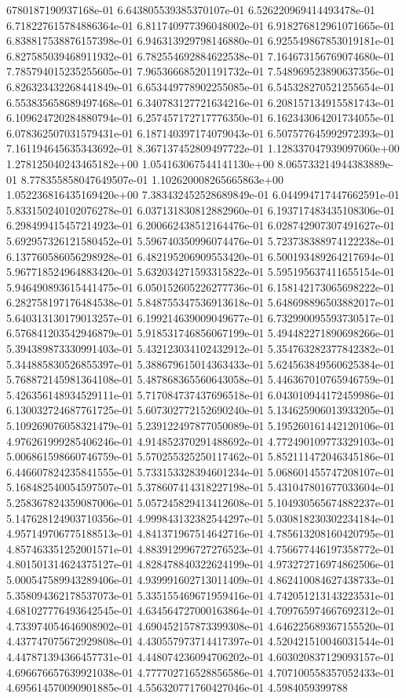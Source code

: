 6780187190937168e-01	6.643805539385370107e-01	6.526220969414493478e-01	6.718227615784886364e-01	6.811740977396048002e-01	6.918276812961071665e-01	6.838817538876157398e-01	6.946313929798146880e-01	6.925549867853019181e-01	6.827585039468911932e-01	6.782554692884622538e-01	7.164673156769074680e-01	7.785794015235255605e-01	7.965366685201191732e-01	7.548969523890637356e-01	6.826323432268441849e-01	6.653449778902255085e-01	6.545328270521255654e-01	6.553835658689497468e-01	6.340783127721634216e-01	6.208157134915581743e-01	6.109624720284880794e-01	6.257457172717776350e-01	6.162343064201734055e-01	6.078362507031579431e-01	6.187140397174079043e-01	6.507577645992972393e-01	7.161194645635343692e-01	8.367137452809497722e-01	1.128337047939097060e+00	1.278125040243465182e+00	1.054163067544141130e+00	8.065733214944383889e-01	8.778355858047649507e-01	1.102620008265665863e+00	1.052236816435169420e+00	7.383432452528689849e-01	6.044994717447662591e-01	5.833150240102076278e-01	6.037131830812882960e-01	6.193717483435108306e-01	6.298499415457214923e-01	6.200662438512164476e-01	6.028742907307491627e-01	5.692957326121580452e-01	5.596740350996074476e-01	5.723738388974122238e-01	6.137760586056298928e-01	6.482195206909553420e-01	6.500193489264217694e-01	5.967718524964883420e-01	5.632034271593315822e-01	5.595195637411655154e-01	5.946490893615441475e-01	6.050152605226277736e-01	6.158142173065698222e-01	6.282758197176484538e-01	5.848755347536913618e-01	5.648698896503882017e-01	5.640313130179013257e-01	6.199214639009049677e-01	6.732990095593730517e-01	6.576841203542946879e-01	5.918531746856067199e-01	5.494482271890698266e-01	5.394389873330991403e-01	5.432123034102432912e-01	5.354763282377842382e-01	5.344885830526855397e-01	5.388679615014363433e-01	5.624563849560625384e-01	5.768872145981364108e-01	5.487868365560643058e-01	5.446367010765946759e-01	5.426356148934529111e-01	5.717084737437696518e-01	6.043010944172459986e-01	6.130032724687761725e-01	5.607302772152690240e-01	5.134625906013933205e-01	5.109269076058321479e-01	5.239122497877050089e-01	5.195260161442120106e-01	4.976261999285406246e-01	4.914852370291488692e-01	4.772490109773329103e-01	5.006861598660746759e-01	5.570255325250117462e-01	5.852111472046345186e-01	6.446607824235841555e-01	5.733153328394601234e-01	5.068601455747208107e-01	5.168482540054597507e-01	5.378607414318227198e-01	5.431047801677033604e-01	5.258367824359087006e-01	5.057245829413412608e-01	5.104930565674882237e-01	5.147628124903710356e-01	4.999843132382544297e-01	5.030818230302234184e-01	4.957149706775188513e-01	4.841371967514642716e-01	4.785613208160420795e-01	4.857463351252001571e-01	4.883912996727276523e-01	4.756677446197358772e-01	4.801501314624375127e-01	4.828478840322624199e-01	4.973272716974862506e-01	5.000547589943289406e-01	4.939991602713011409e-01	4.862410084627438733e-01	5.358094362178537073e-01	5.335155469671959416e-01	4.742051213143223531e-01	4.681027776493642545e-01	4.634564727000163864e-01	4.709765974667692312e-01	4.733974054646908902e-01	4.690452157873399308e-01	4.646225689367155520e-01	4.437747075672929808e-01	4.430557973714417397e-01	4.520421510046031544e-01	4.447871394366457731e-01	4.448074236094706202e-01	4.603020837129093157e-01	4.696676657639921038e-01	4.777702716528856586e-01	4.707100558357052433e-01	4.695614570090901885e-01	4.556320771760427046e-01	4.5984059399788
